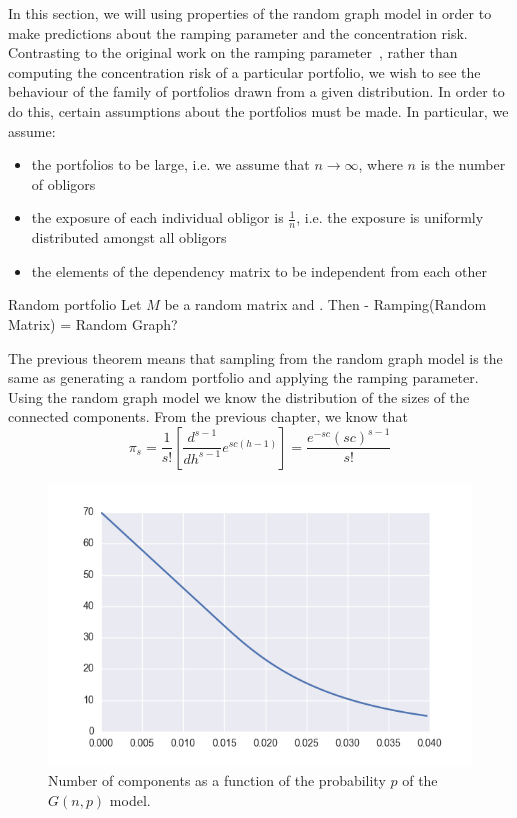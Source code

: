 In this section, we will using properties of the random graph model in order to make predictions about the ramping parameter and the concentration risk.
Contrasting to the original work on the ramping parameter~\cite{Sindel:2009vb}, rather than computing the concentration risk of a particular portfolio, we wish to see the behaviour of the family of portfolios drawn from a given distribution.
In order to do this, certain assumptions about the portfolios must be made.
In particular, we assume:
\begin{itemize}
	\item the portfolios to be large, i.e. we assume that $n \rightarrow \infty$, where $n$ is the number of obligors
	\item the exposure of each individual obligor is $\frac{1}{n}$, i.e. the exposure is uniformly distributed amongst all obligors
	\item the elements of the dependency matrix to be independent from each other
\end{itemize}


\begin{theorem}{Random portfolio}
Let $M$ be a random matrix and  . Then 
- Ramping(Random Matrix) = Random Graph?
\end{theorem}


The previous theorem means that sampling from the random graph model is the same as generating a random portfolio and applying the ramping parameter.
Using the random graph model we know the distribution of the sizes of the connected components.
From the previous chapter, we know that
\begin{equation}
	\pi_s = \frac{1}{s!}\left[  \frac{d^{s-1}}{dh^{s-1}}e^{s c(h-1)}  \right] = \frac{e^{-s c} (s c)^{s-1}}{s!}
\end{equation}







\begin{figure}[tb]
	\centering
	\includegraphics[]{figures/gnp_number_components.png}
	\caption{Number of components as a function of the probability $p$ of the $G(n,p)$ model.}
	\label{fig:figure1}
\end{figure}


